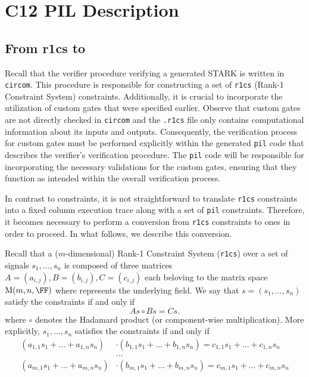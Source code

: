 \section{C12 PIL Description}

\subsection{From r1cs to \plonk}

Recall that the verifier procedure verifying a generated STARK is written in \texttt{circom}. This procedure is responsible for constructing a set of \texttt{r1cs} (Rank-1 Constraint System) constraints.  Additionally, it is crucial to incorporate the utilization of custom gates that were specified earlier. Observe that custom gates are not directly checked in \texttt{circom} and the \texttt{.r1cs} file only contains computational information about its inputs and outputs. Consequently, the verification process for custom gates must be performed explicitly within the generated \texttt{pil} code that describes the verifier's verification procedure. The \texttt{pil} code will be responsible for incorporating the necessary validations for the custom gates, ensuring that they function as intended within the overall verification process. 

In contrast to \plonk constraints, it is not straightforward to translate \texttt{r1cs} constraints into a fixed column execution trace along with a set of \texttt{pil} constraints. Therefore, it becomes necessary to perform a conversion from \texttt{r1cs} constraints to \plonk ones in order to proceed. In what follows, we describe this conversion. 

Recall that a ($m$-dimensional) Rank-1 Constraint System (\texttt{r1cs}) over a set of signals $s_1, \dots, s_n$ is composed of three matrices $A = (a_{i, j}), B = (b_{i, j}),  C = (c_{i, j})$ each beloving to the matrix space $\mathrm{M}(m, n, \FF)$ where \FF represents the underlying field. We say that $s = (s_1, \dots, s_n)$ satisfy the constraints if and only if 
\[
As \circ Bs = Cs.
\]
where $\circ$ denotes the Hadamard product (or component-wise multiplication). More explicitly, $s_1, \dots, s_n$ satisfies the constraints if and only if
\begin{align*}
\left( a_{1, 1} s_1 + \dots + a_{1, n} s_n \right) &\cdot \left( b_{1, 1} s_1 + \dots + b_{1, n} s_n \right) = c_{1, 1} s_1 + \dots + c_{1, n} s_n \\
&\dots  \\
\left( a_{m, 1} s_1 + \dots + a_{m, n} s_n \right) &\cdot \left( b_{m, 1} s_1 + \dots + b_{m, n} s_n \right) = c_{m, 1} s_1 + \dots + c_{m, n} s_n \\
\end{align*}


